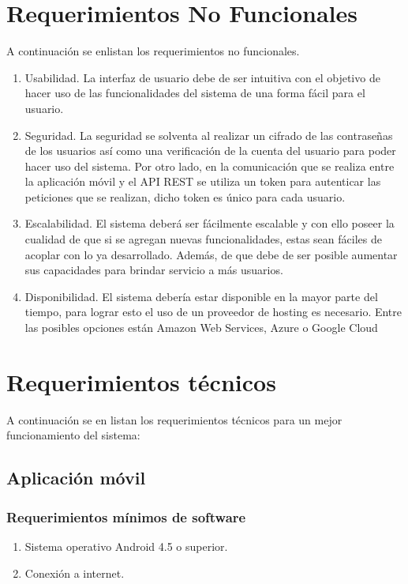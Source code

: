 \section{Requerimientos No Funcionales} 
    A continuación se enlistan los requerimientos no funcionales.
        \begin{enumerate}[label=RNF\arabic*.]
            \item Usabilidad. La interfaz de usuario debe de ser intuitiva con el objetivo de hacer uso de las funcionalidades del sistema de una forma fácil para el usuario.
            
            \item Seguridad. La seguridad se solventa al realizar un cifrado de las contraseñas de los usuarios así como una verificación de la cuenta del usuario para poder hacer uso del sistema. Por otro lado, en la comunicación que se realiza entre la aplicación móvil y el API REST se utiliza un token para autenticar las peticiones que se realizan, dicho token es único para cada usuario. 
            
            \item Escalabilidad. El sistema deberá ser fácilmente escalable y con ello poseer la cualidad de que si se agregan nuevas funcionalidades, estas sean fáciles de acoplar con lo ya desarrollado. Además, de que debe de ser posible aumentar sus capacidades para brindar servicio a más usuarios.
            
            \item Disponibilidad. El sistema debería estar disponible en la mayor parte del tiempo, para lograr esto el uso de un proveedor de hosting es necesario. Entre las posibles opciones están Amazon Web Services, Azure o Google Cloud
            
        \end{enumerate}    
\section{Requerimientos técnicos}
    A continuación se en listan los requerimientos técnicos para un mejor funcionamiento del sistema:
    \subsection{Aplicación móvil}
    \subsubsection{Requerimientos mínimos de software}
    \begin{enumerate}
        \item Sistema operativo Android 4.5 o superior.
        \item Conexión a internet.
    \end{enumerate}
    
